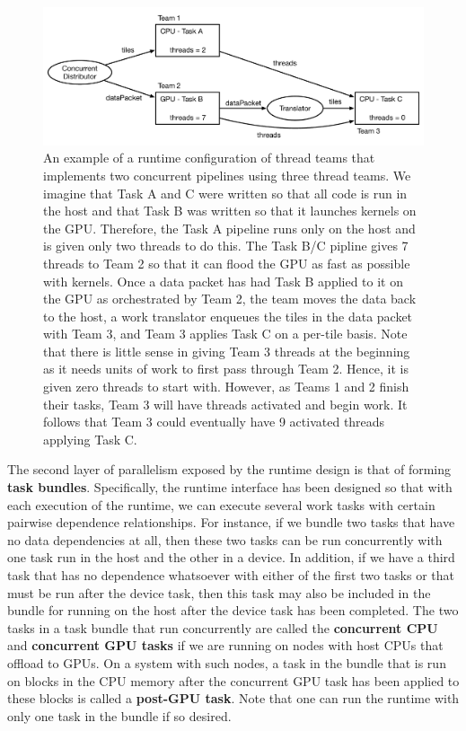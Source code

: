 \documentclass{article}
\begin{document}
\begin{figure}[!ht]
\begin{center}
\includegraphics[width=5.5in]{ConcurrentItorExample.pdf}
\caption[]{An example of a runtime configuration of thread teams that implements
two concurrent pipelines using three thread teams.  We imagine that Task A and C
were written so that all code is run in the host and that Task B was written so
that it launches kernels on the GPU.  Therefore, the Task A pipeline runs
only on the host and is given only two threads to do this.  The Task B/C
pipline gives 7 threads to Team 2 so that it can flood the GPU as fast as possible with
kernels.  Once a data packet has had Task B applied to it on the GPU as
orchestrated by Team 2, the team moves the data back to the host, a work
translator enqueues the tiles in the data packet with Team 3, and Team 3 applies
Task C on a per-tile basis.  Note that there is little sense in giving Team 3
threads at the beginning as it needs units of work to first pass through Team 2.
Hence, it is given zero threads to start with.  However, as Teams 1 and 2 finish
their tasks, Team 3 will have threads activated and begin work.  It follows that
Team 3 could eventually have 9 activated threads applying Task C.}
\label{fig:ConcurrentItor}
\end{center}
\end{figure}

The second layer of parallelism exposed by the runtime design is that of forming
\textbf{task bundles}.  Specifically, the runtime interface has been designed so
that with each execution of the runtime, we can execute several work tasks with
certain pairwise dependence relationships.  For instance, if we bundle two tasks
that have no data dependencies at all, then these two tasks can be run
concurrently with one task run in the host and the other in a device.  In
addition, if we have a third task that has no dependence whatsoever with either
of the first two tasks or that must be run after the device task, then this
task may also be included in the bundle for running on the host after the device
task has been completed.  The two tasks in a task bundle that run concurrently
are called the \textbf{concurrent CPU} and \textbf{concurrent GPU tasks} if we are
running on nodes with host CPUs that offload to GPUs.  On a system with such nodes, a
task in the bundle that is run on blocks in the CPU memory after the concurrent
GPU task has been applied to these blocks is called a \textbf{post-GPU
task}.  Note that one can run the runtime with only one task in the bundle
if so desired.\\
\end{document}
